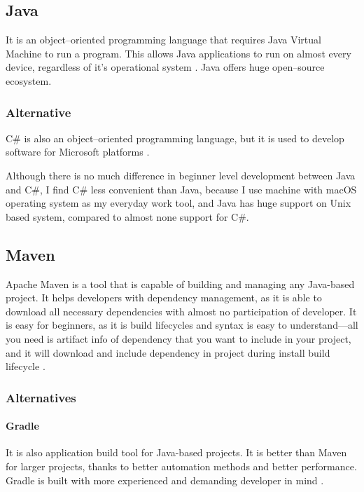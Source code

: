 \documentclass[a4paper,twoside,12pt]{book}
\begin{document}
    \subsection{Java}
      It is an object--oriented programming language that requires Java Virtual Machine to run a program. 
      This allows Java applications to run on almost every device, regardless of it's operational system \cite{bib:horstmann2008core}.
      Java offers huge open--source ecosystem.

      \subsubsection{Alternative}
        C\# is also an object--oriented programming language, but it is used to develop software for Microsoft platforms \cite{bib:thai2003net}.

      Although there is no much difference in beginner level development between Java and C\#, I find C\# less convenient than Java,
      because I use machine with macOS operating system as my everyday work tool, and Java has huge support on Unix based system, compared to almost none support for C\#.

    \subsection{Maven}
      Apache Maven is a tool that is capable of building and managing any Java-based project. 
      It helps developers with dependency management, as it is able to download all necessary dependencies with almost no participation of developer.
      It is easy for beginners, as it is build lifecycles and syntax is easy to understand---all you need is artifact info of dependency that you want to include in your project, 
      and it will download and include dependency in project during install build lifecycle \cite{bib:maven}.

      \subsubsection{Alternatives}
        \paragraph{Gradle}
          It is also application build tool for Java-based projects. It is better than Maven for larger projects, thanks to better automation methods and better performance.
          Gradle is built with more experienced and demanding developer in mind \cite{bib:gradle}.
        
\end{document}

